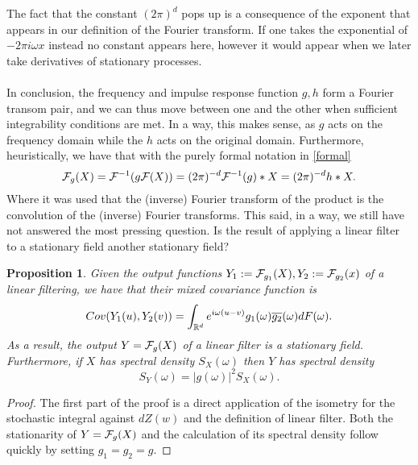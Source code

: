 \documentclass[12pt]{article}
\newtheorem{proposition}{Proposition}
\begin{document}
The fact that the constant $(2\pi)^d$ pops up is a consequence of the exponent that appears in our definition of the Fourier transform. If one takes the exponential of $-2\pi i\omega x$ instead no constant appears here, however it would appear when we later take derivatives of stationary processes.\\
\\
In conclusion, the frequency and impulse response function $g,h$ form a Fourier transom pair, and we can thus move between one and the other when sufficient integrability conditions are met. In a way, this makes sense, as $g$ acts on the frequency domain while the $h$ acts on the original domain. Furthermore, heuristically, we have that with the purely formal notation in \eqref{formal}
\begin{equation*}
    \mathcal{F}_g(X)=\mathcal{F}^{-1}(g\mathcal{F}(X))=(2\pi)^{-d}\mathcal{F}^{-1}(g)*X=(2\pi)^{-d}h*X.
\end{equation*}
Where it was used that the (inverse) Fourier transform of the product is the convolution of the (inverse) Fourier transforms.
This said,
in a way,  we still have not answered the most pressing question. Is the result of applying a linear filter to a stationary field another stationary field?

\begin{proposition}\label{dens linear filter}
    Given the output functions $Y_1:=\mathcal{F}_{g_1}(X),Y_2:=\mathcal{F}_{g_2}(x)$ of a linear filtering, we have that their mixed covariance function is
    \begin{equation*}
        Cov(Y_1(u),Y_2(v))=\int_{{\mathbb R}^d}e^{i\omega (u-v)}g_1(\omega)\overline{g_2}(\omega) dF(\omega)    .
    \end{equation*}
    As a result, the output $Y=\mathcal{F}_{g}(X)$ of a linear filter is a stationary field. Furthermore, if $X$ has spectral density  $S_X(\omega)$ then $Y$ has spectral density
    $$S_Y(\omega)=|g(\omega)|^2 S_X(\omega).$$
\end{proposition}
\begin{proof}
    The first part of the proof is a direct application of the isometry for the stochastic integral against $dZ(w)$ and the definition of linear filter. Both the stationarity of  $Y=\mathcal{F}_g(X)$ and the calculation of its spectral density follow quickly by setting $g_1=g_2=g$.
\end{proof}
\end{document}
